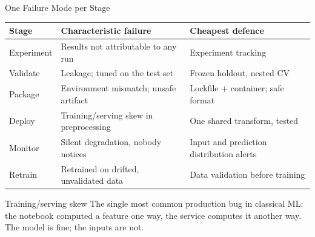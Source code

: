 
\begin{frame}{One Failure Mode per Stage}

    \centering
    \renewcommand{\arraystretch}{1.3}
    {\scriptsize
    \begin{tabular}{p{2.0cm}|p{4.4cm}|p{4.6cm}}
        \toprule
        \textbf{Stage} & \textbf{Characteristic failure} & \textbf{Cheapest defence} \\
        \midrule
        Experiment & Results not attributable to any run & Experiment tracking \\
        Validate   & Leakage; tuned on the test set      & Frozen holdout, nested CV \\
        Package    & Environment mismatch; unsafe artifact & Lockfile + container; safe format \\
        Deploy     & Training/serving skew in preprocessing & One shared transform, tested \\
        Monitor    & Silent degradation, nobody notices  & Input and prediction distribution alerts \\
        Retrain    & Retrained on drifted, unvalidated data & Data validation before training \\
        \bottomrule
    \end{tabular}}

    \vspace{0.3em}
    \begin{block}{Training/serving skew}
        The single most common production bug in classical ML: the notebook computed a feature one way,
        the service computes it another way. The model is fine; the inputs are not.
    \end{block}

\end{frame}

